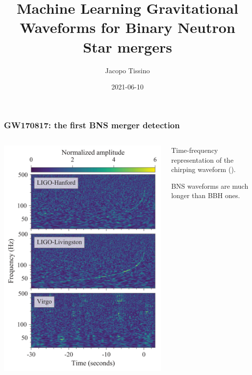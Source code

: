 \documentclass{beamer}
\title{Machine Learning Gravitational Waveforms for Binary Neutron Star mergers}
\author{Jacopo Tissino}
\date{2021-06-10}
\begin{document}
\frame{\titlepage}

\begin{frame}
    \frametitle{GW170817: the first BNS merger detection}
    \begin{columns}
        
    \begin{column}{0.5\textwidth}
    \includegraphics[width=\textwidth]{figures/836px-GW170817_spectrograms.svg.png}
    \end{column}

    \begin{column}{0.5\textwidth}
    Time-frequency representation of the chirping waveform
    (\cite[]{abbottGW170817ObservationGravitational2017}).

    BNS waveforms are much longer than BBH ones.
    \end{column}
    \end{columns}
\end{frame}
\end{document}
